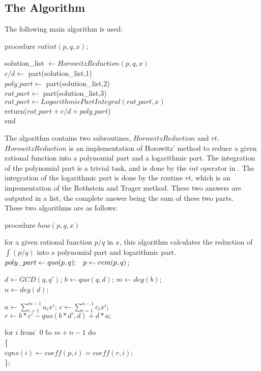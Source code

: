 \subsection{The Algorithm}
The following main algorithm is used:

procedure $ratint(p,q,x);$


    solution\_list $\leftarrow HorowitzReduction(p,q,x)$ 
 \\
    $c/d \leftarrow$ part(solution\_list,1)\\  
    $poly\_part \leftarrow$ part(solution\_list,2)
  \\
    $rat\_part \leftarrow$ part(solution\_list,3)
\\
    $rat\_part \leftarrow LogarithmicPartIntegral(rat\_part,x) $
\\
 return($rat\_part+c/d +poly\_part$)
\\
end

The algorithm contains two subroutines, $HorowitzReduction$ and $rt$. $HorowitzReduction$ is an implementation of Horowitz' method to reduce a given rational function into a polynomial part and a logarithmic part. The integration of the polynomial part is a trivial task, and is done by the $int$ operator in \REDUCE. The integration of the logarithmic part is done by the routine $rt$, which is an impementation of the Rothstein and Trager method. These two answers are outputed in a list, the complete answer being the sum of these two parts.
\\
These two algorithms are as follows:

procedure $how(p,q,x)$

for a given rational function $p/q$ in $x$, this algorithm calculates the
reduction of $ \int(p/q)$ into a polynomial part and logarithmic part. \\[\baselineskip]
$ poly\_part \leftarrow quo(p,q); \hspace{3 mm}  p \leftarrow rem(p,q)$;

$d \leftarrow GCD(q,q') $; \hspace{3 mm}    $b \leftarrow quo(q,d)$; \hspace{3 mm}
$m \leftarrow deg(b)$; \\  $n \leftarrow deg(d)$;

$a \leftarrow  \sum_{i=1}^{m-1} a_{i}x^{i}$; \hspace{3 mm}
   $ c \leftarrow \sum_{i=1}^{n-1} c_{i}x^{i}$; \\[\baselineskip]
%
$r \leftarrow b*c'-quo(b*d',d)+d*a; $
\vspace*{\baselineskip}
\begin{tabbing}
for $i$ from \= $0$ \=  to $m+n-1$ do \\
\> \{ \\
\> \>   $  eqns(i) \leftarrow coeff(p,i)=coeff(r,i)$; \\
\> \};
\end{tabbing}

